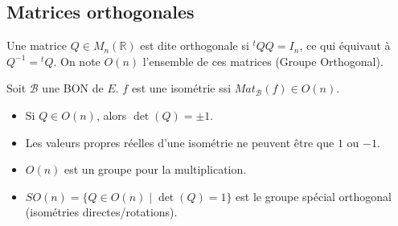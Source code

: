 \documentclass[french]{yLectureNote}
\newcommand{\R}[0]{\mathbb{R}}
\newcommand{\norm}[1]{\left\|#1\right\|}
\newcommand{\ps}[2]{(#1|#2)}
\begin{document}

\subsection{Matrices orthogonales}

\begin{definition}
    Une matrice $Q \in M_n(\R)$ est dite orthogonale si ${}^tQQ = I_n$, ce qui équivaut à $Q^{-1} = {}^tQ$. On note $O(n)$ l'ensemble de ces matrices (Groupe Orthogonal).
\end{definition}

\begin{proposition}
    Soit $\mathcal{B}$ une BON de $E$. $f$ est une isométrie ssi $Mat_{\mathcal{B}}(f) \in O(n)$.
\end{proposition}

\begin{proposition}[Propriétés de $O(n)$]
    \begin{itemize}
        \item Si $Q \in O(n)$, alors $\det(Q) = \pm 1$.
        \item Les valeurs propres réelles d'une isométrie ne peuvent être que $1$ ou $-1$.
        \item $O(n)$ est un groupe pour la multiplication.
        \item $SO(n) = \{Q \in O(n) \mid \det(Q) = 1\}$ est le groupe spécial orthogonal (isométries directes/rotations).
    \end{itemize}
\end{proposition}
\end{document}
